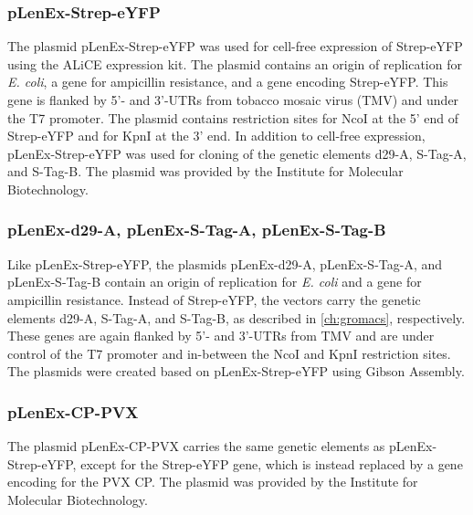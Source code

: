 \subsubsection{pLenEx-Strep-eYFP}
The plasmid pLenEx-Strep-eYFP was used for cell-free expression of Strep-eYFP using the ALiCE\textsuperscript{\textregistered} expression kit. The plasmid contains an origin of replication for \emph{E. coli}, a gene for ampicillin resistance, and a gene encoding Strep-eYFP. This gene is flanked by 5'- and 3'-UTRs from tobacco mosaic virus (TMV) and under the T7 promoter. The plasmid contains restriction sites for NcoI at the 5' end of Strep-eYFP and for KpnI at the 3' end. In addition to cell-free expression, pLenEx-Strep-eYFP was used for cloning of the genetic elements d29-A, S-Tag-A, and S-Tag-B. The plasmid was provided by the Institute for Molecular Biotechnology.

\subsubsection{pLenEx-d29-A, pLenEx-S-Tag-A, pLenEx-S-Tag-B}
Like pLenEx-Strep-eYFP, the plasmids pLenEx-d29-A, pLenEx-S-Tag-A, and pLenEx-S-Tag-B contain an origin of replication for \emph{E. coli} and a gene for ampicillin resistance. Instead of Strep-eYFP, the vectors carry the genetic elements d29-A, S-Tag-A, and S-Tag-B, as described in \autoref{ch:gromacs}, respectively. These genes are again flanked by 5'- and 3'-UTRs from TMV and are under control of the T7 promoter and in-between the NcoI and KpnI restriction sites. The plasmids were created based on pLenEx-Strep-eYFP using Gibson Assembly.


\subsubsection{pLenEx-CP-PVX}
The plasmid pLenEx-CP-PVX carries the same genetic elements as pLenEx-Strep-eYFP, except for the Strep-eYFP gene, which is instead replaced by a gene encoding for the PVX CP. The plasmid was provided by the Institute for Molecular Biotechnology.
\FloatBarrier

